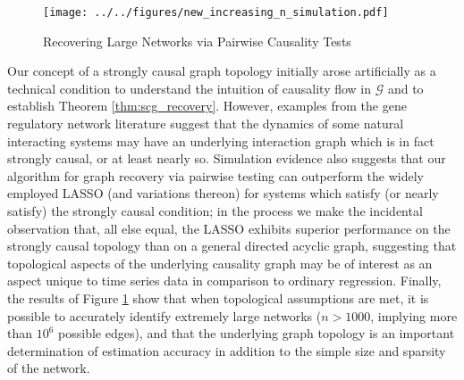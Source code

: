 \documentclass[12pt]{article}
\def\gcg{\mathcal{G}}  %
\begin{document}
\begin{figure}[h]
  \centering
  \caption{Recovering Large Networks via Pairwise Causality Tests}
  \label{fig:large_n_figure}
  \texttt{[image: ../../figures/new\_increasing\_n\_simulation.pdf]}
\end{figure}

Our concept of a strongly causal graph topology initially arose
artificially as a technical condition to understand the intuition of
causality flow in $\gcg$ and to establish Theorem
\ref{thm:scg_recovery}.  However, examples from the gene regulatory
network literature suggest that the dynamics of some natural
interacting systems may have an underlying interaction graph which is
in fact strongly causal, or at least nearly so.  Simulation evidence
also suggests that our algorithm for graph recovery via pairwise
testing can outperform the widely employed LASSO (and variations
thereon) for systems which satisfy (or nearly satisfy) the strongly
causal condition; in the process we make the incidental observation
that, all else equal, the LASSO exhibits superior performance on the
strongly causal topology than on a general directed acyclic graph,
suggesting that topological aspects of the underlying causality graph
may be of interest as an aspect unique to time series data in
comparison to ordinary regression.  Finally, the results of Figure
\ref{fig:large_n_figure} show that when topological assumptions are
met, it is possible to accurately identify extremely large networks
($n > 1000$, implying more than $10^6$ possible edges), and that the
underlying graph topology is an important determination of estimation
accuracy in addition to the simple size and sparsity of the network.
 
\end{document}
